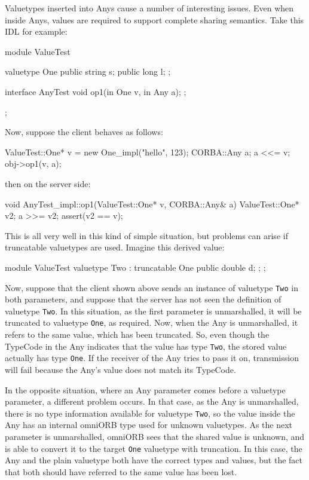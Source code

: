\documentclass[11pt,twoside,a4paper]{book}
\newcommand{\type}[1]{\texttt{#1}}
\begin{document}
Valuetypes inserted into Anys cause a number of interesting issues.
Even when inside Anys, values are required to support complete sharing
semantics. Take this IDL for example:

\begin{idllisting}
module ValueTest {
  valuetype One {
    public string s;
    public long   l;
  };

  interface AnyTest {
    void op1(in One v, in Any a);
  };
};
\end{idllisting}

\noindent Now, suppose the client behaves as follows:

\begin{cxxlisting}
ValueTest::One* v = new One_impl("hello", 123);
CORBA::Any a;
a <<= v;
obj->op1(v, a);
\end{cxxlisting}

\noindent then on the server side:

\begin{cxxlisting}
void AnyTest_impl::op1(ValueTest::One* v, CORBA::Any& a)
{
  ValueTest::One* v2;
  a >>= v2;
  assert(v2 == v);
}
\end{cxxlisting}

\noindent
This is all very well in this kind of simple situation, but problems
can arise if truncatable valuetypes are used. Imagine this derived
value:

\begin{idllisting}
module ValueTest {
  valuetype Two : truncatable One {
    public double d;
  };
};
\end{idllisting}

\noindent
Now, suppose that the client shown above sends an instance of
valuetype \type{Two} in both parameters, and suppose that the server
has not seen the definition of valuetype \type{Two}. In this
situation, as the first parameter is unmarshalled, it will be
truncated to valuetype \type{One}, as required. Now, when the Any is
unmarshalled, it refers to the same value, which has been truncated.
So, even though the TypeCode in the Any indicates that the value has
type \type{Two}, the stored value actually has type \type{One}. If the
receiver of the Any tries to pass it on, transmission will fail
because the Any's value does not match its TypeCode.

In the opposite situation, where an Any parameter comes before a
valuetype parameter, a different problem occurs. In that case, as the
Any is unmarshalled, there is no type information available for
valuetype \type{Two}, so the value inside the Any has an internal
omniORB type used for unknown valuetypes. As the next parameter is
unmarshalled, omniORB sees that the shared value is unknown, and is
able to convert it to the target \type{One} valuetype with
truncation. In this case, the Any and the plain valuetype both have
the correct types and values, but the fact that both should have
referred to the same value has been lost.
\end{document}
